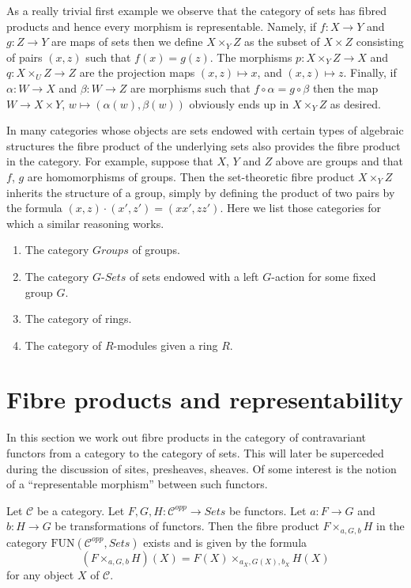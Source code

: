 \medskip\noindent
As a really trivial first example we observe
that the category of sets has fibred products and hence every
morphism is representable. Namely, if $f : X \to Y$
and $g : Z \to Y$ are maps of sets then we define
$X \times_Y Z$ as the subset of $X \times Z$ consisting
of pairs $(x, z)$ such that $f(x) = g(z)$. The morphisms
$p : X \times_Y Z \to X$ and $q : X \times_U Z \to Z$ are
the projection maps $(x, z) \mapsto x$, and $(x, z) \mapsto z$.
Finally, if $\alpha : W \to X$ and $\beta : W \to Z$
are morphisms such that $f \circ \alpha = g \circ \beta$
then the map $W \to X \times Y$, $w\mapsto (\alpha(w), \beta(w))$
obviously ends up in $X \times_Y Z$ as desired.

\medskip\noindent
In many categories whose objects are sets endowed with certain types of
algebraic structures the fibre product of the underlying sets also
provides the fibre product in the category. For example, suppose
that $X$, $Y$ and $Z$ above are groups and that $f$, $g$ are
homomorphisms of groups. Then the set-theoretic fibre product
$X \times_Y Z$ inherits the structure of a group, simply by
defining the product of two pairs by the formula
$(x, z) \cdot (x', z') = (xx', zz')$. Here we list those categories
for which a similar reasoning works.
\begin{enumerate}
\item The category $\textit{Groups}$ of groups.
\item The category $G\textit{-Sets}$ of sets
endowed with a left $G$-action for some fixed group $G$.
\item The category of rings.
\item The category of $R$-modules given a ring $R$.
\end{enumerate}




\section{Fibre products and representability}
\label{section-representable-map-presheaves}

\noindent
In this section we work out fibre products in the
category of contravariant functors from a category
to the category of sets. This will later be superceded
during the discussion of sites, presheaves, sheaves. Of some
interest is the notion of a ``representable morphism'' between
such functors.

\begin{lemma}
\label{lemma-fibre-product-presheaves}
Let $\mathcal{C}$ be a category.
Let $F, G, H : \mathcal{C}^{opp} \to \textit{Sets}$
be functors. Let $a : F \to G$ and $b : H \to G$ be
transformations of functors. Then the fibre product
$F \times_{a, G, b} H$ in the category
$\text{FUN}(\mathcal{C}^{opp}, \textit{Sets})$
exists and is given by the formula
$$
(F \times_{a, G, b} H)(X) =
F(X) \times_{a_X, G(X), b_X} H(X)
$$
for any object $X$ of $\mathcal{C}$.
\end{lemma}

